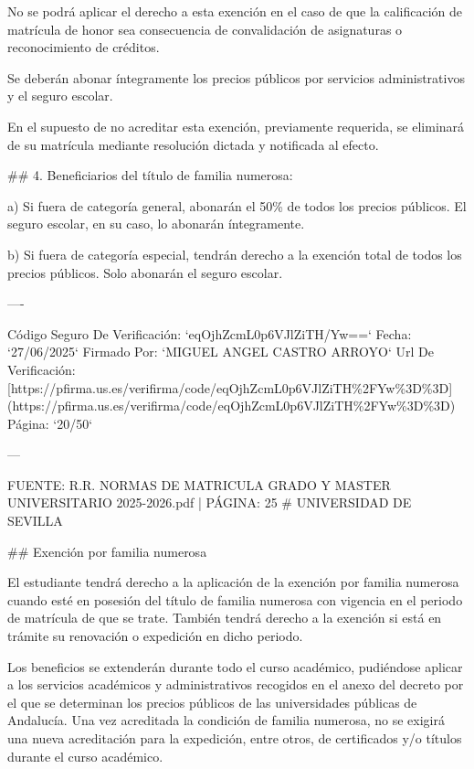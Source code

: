 \documentclass{article}
\begin{document}
\begin{itemize}
\begin{itemize}
\begin{scriptsize}
                  No se podrá aplicar el derecho a esta exención en el caso de que la calificación de matrícula de honor sea consecuencia de convalidación de asignaturas o reconocimiento de créditos.

                  Se deberán abonar íntegramente los precios públicos por servicios administrativos y el seguro escolar.

                  En el supuesto de no acreditar esta exención, previamente requerida, se eliminará de su matrícula mediante resolución dictada y notificada al efecto.

                  \#\# 4. Beneficiarios del título de familia numerosa:

                  a) Si fuera de categoría general, abonarán el 50\% de todos los precios públicos. El seguro escolar, en su caso, lo abonarán íntegramente.

                  b) Si fuera de categoría especial, tendrán derecho a la exención total de todos los precios públicos. Solo abonarán el seguro escolar.

                  ----

                  Código Seguro De Verificación: `eqOjhZcmL0p6VJlZiTH/Yw==`
                  Fecha: `27/06/2025`
                  Firmado Por: `MIGUEL ANGEL CASTRO ARROYO`
                  Url De Verificación: [https://pfirma.us.es/verifirma/code/eqOjhZcmL0p6VJlZiTH\%2FYw\%3D\%3D](https://pfirma.us.es/verifirma/code/eqOjhZcmL0p6VJlZiTH\%2FYw\%3D\%3D)
                  Página: `20/50`

                  ---

                  FUENTE: R.R. NORMAS DE MATRICULA GRADO Y MASTER UNIVERSITARIO 2025-2026.pdf | PÁGINA: 25
                  \# UNIVERSIDAD DE SEVILLA

                  \#\# Exención por familia numerosa

                  El estudiante tendrá derecho a la aplicación de la exención por familia numerosa cuando esté en posesión del título de familia numerosa con vigencia en el periodo de matrícula de que se trate. También tendrá derecho a la exención si está en trámite su renovación o expedición en dicho periodo.

                  Los beneficios se extenderán durante todo el curso académico, pudiéndose aplicar a los servicios académicos y administrativos recogidos en el anexo del decreto por el que se determinan los precios públicos de las universidades públicas de Andalucía. Una vez acreditada la condición de familia numerosa, no se exigirá una nueva acreditación para la expedición, entre otros, de certificados y/o títulos durante el curso académico.


\end{scriptsize}
\end{itemize}
\end{itemize}
\end{document}
